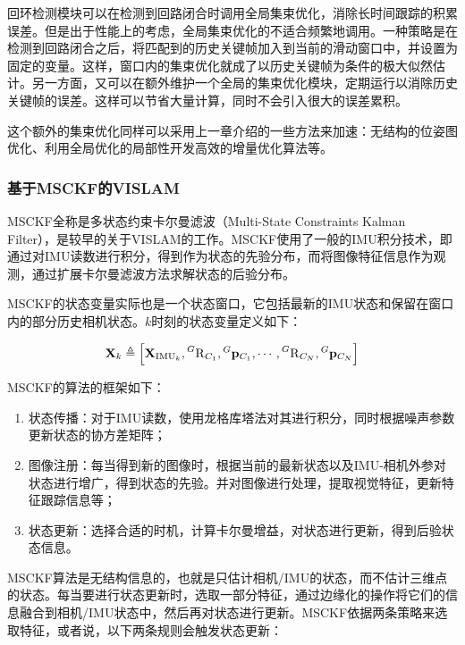 回环检测模块可以在检测到回路闭合时调用全局集束优化，消除长时间跟踪的积累误差。但是出于性能上的考虑，全局集束优化的不适合频繁地调用。一种策略是在检测到回路闭合之后，将匹配到的历史关键帧加入到当前的滑动窗口中，并设置为固定的变量。这样，窗口内的集束优化就成了以历史关键帧为条件的极大似然估计。另一方面，又可以在额外维护一个全局的集束优化模块，定期运行以消除历史关键帧的误差。这样可以节省大量计算，同时不会引入很大的误差累积。

这个额外的集束优化同样可以采用上一章介绍的一些方法来加速：无结构的位姿图优化、利用全局优化的局部性开发高效的增量优化算法等。

\subsubsection{基于MSCKF的VISLAM}

MSCKF全称是多状态约束卡尔曼滤波（Multi-State Constraints Kalman Filter），是较早的关于VISLAM的工作。MSCKF使用了一般的IMU积分技术，即通过对IMU读数进行积分，得到作为状态的先验分布，而将图像特征信息作为观测，通过扩展卡尔曼滤波方法求解状态的后验分布。

MSCKF的状态变量实际也是一个状态窗口，它包括最新的IMU状态和保留在窗口内的部分历史相机状态。$k$时刻的状态变量定义如下：

\begin{equation}
    \mathbf{X}_k \triangleq
    \left[
        \mathbf{X}_{\textrm{IMU}_k},
        \prescript{G}{}{\mathrm R}_{C_1},
        \prescript{G}{}{\mathbf p}_{C_1},
        \cdots,
        \prescript{G}{}{\mathrm R}_{C_N},
        \prescript{G}{}{\mathbf p}_{C_N}
    \right]
\end{equation}

MSCKF的算法的框架如下：

\begin{enumerate}
    \item 状态传播：对于IMU读数，使用龙格库塔法对其进行积分，同时根据噪声参数更新状态的协方差矩阵；
    \item 图像注册：每当得到新的图像时，根据当前的最新状态以及IMU-相机外参对状态进行增广，得到状态的先验。并对图像进行处理，提取视觉特征，更新特征跟踪信息等；
    \item 状态更新：选择合适的时机，计算卡尔曼增益，对状态进行更新，得到后验状态信息。
\end{enumerate}

MSCKF算法是无结构信息的，也就是只估计相机/IMU的状态，而不估计三维点的状态。每当要进行状态更新时，选取一部分特征，通过边缘化的操作将它们的信息融合到相机/IMU状态中，然后再对状态进行更新。MSCKF依据两条策略来选取特征，或者说，以下两条规则会触发状态更新：

